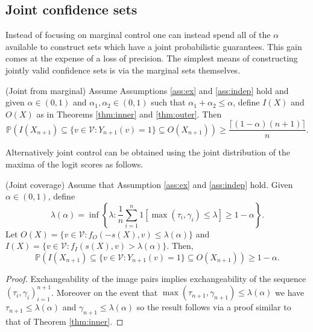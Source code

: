 \subsection{Joint confidence sets}\label{SS:joint}
Instead of focusing on marginal control one can instead spend all of the $\alpha$ available to construct sets which have a joint probabilistic guarantees. This gain comes at the expense of a loss of precision. The simplest means of constructing jointly valid confidence sets is via the marginal sets themselves.
\begin{corollary}\label{cor:weighting}
	(Joint from marginal) Assume Assumptions \ref{ass:ex} and \ref{ass:indep} hold and given $\alpha \in (0,1)$ and $\alpha_1, \alpha_2 \in (0,1)$ such that $\alpha_1 + \alpha_2 \leq \alpha$, define $I(X)$ and  $O(X)$ as in Theorems \ref{thm:inner} and \ref{thm:outer}. Then 
	\begin{equation}
		\mathbb{P}\left( I(X_{n+1}) \subseteq \lbrace v\in \mathcal{V}: Y_{n+1}(v) = 1 \rbrace \subseteq O(X_{n+1})  \right) \geq  \frac{\lceil (1-\alpha)(n+1) \rceil}{n}. 
	\end{equation}
\end{corollary}
Alternatively joint control can be obtained using the joint distribution of the maxima of the logit scores as follows.
\begin{theorem}\label{thm:joint}
	(Joint coverage) Assume that Assumption \ref{ass:ex} and \ref{ass:indep}  hold. Given $\alpha \in (0,1)$, define 
	\begin{equation*}
		\lambda(\alpha) = \inf\left\lbrace \lambda: \frac{1}{n} \sum_{i = 1}^n 1\left[ \max(\tau_i, \gamma_i) \leq \lambda \right] \geq 1-\alpha \right\rbrace.
	\end{equation*}
 Let $O(X) = \lbrace v \in \mathcal{V}: f_O(-s(X),v) \leq \lambda(\alpha) \rbrace $ and $I(X) = \lbrace v \in \mathcal{V}: f_I(s(X),v) >	\lambda(\alpha) \rbrace $. Then,
\begin{equation}\label{eq:probstat}
	\mathbb{P}\left( I(X_{n+1}) \subseteq \lbrace v\in \mathcal{V}: Y_{n+1}(v) = 1 \rbrace \subseteq O(X_{n+1}) \right) \geq 1 - \alpha.
\end{equation}
\end{theorem}
\begin{proof}
	Exchangeability of the image pairs implies exchangeability of the sequence $(\tau_i, \gamma_i)_{i = 1}^{n+1}$. Moreover on the event that $\max(\tau_{n+1}, \gamma_{n+1}) \leq \lambda(\alpha)$ we have $\tau_{n+1} \leq \lambda(\alpha)$ and $\gamma_{n+1} \leq \lambda(\alpha)$ so the result follows via a proof similar to that of Theorem \ref{thm:inner}.
\end{proof}


